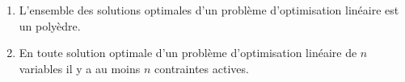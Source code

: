 \begin{enumerate}
\begin{enumerate}

      \item L'ensemble des solutions optimales d'un problème d'optimisation linéaire est un polyèdre.





      \item En toute solution optimale d'un problème d'optimisation linéaire de
        $n$ variables il y a au moins $n$  contraintes actives.













    \end{enumerate}


\end{enumerate}
